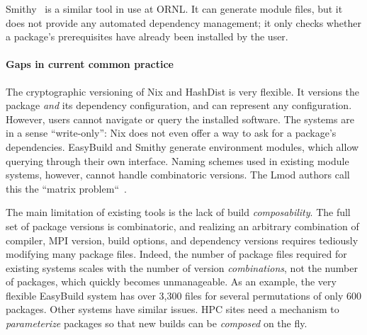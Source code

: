Smithy~\cite{digirolamo:smithy} is a similar tool in use at ORNL. It
can generate module files, but it does not provide any
automated dependency management; it only checks whether a package's
prerequisites have already been installed by the user.

\paragraph{Gaps in current common practice}
The cryptographic versioning of Nix and HashDist is very flexible. It versions
the package {\it and} its dependency configuration, and can represent any
configuration. However, users cannot navigate or query the installed software.
The systems are in a sense ``write-only'':
Nix does not even offer a way to ask for a package's dependencies.
%
EasyBuild and Smithy generate environment modules, which allow querying
through their own interface. Naming schemes used in existing module systems, however, cannot
handle combinatoric versions. The Lmod authors call this the
``matrix problem``~\cite{mclay:lmod-tutorial}.



The main limitation of existing tools is the lack of build {\it composability}.
The full set of package versions is combinatoric, and realizing an arbitrary
combination of compiler, MPI version, build options, and dependency versions
requires tediously modifying many package files.
%
Indeed, the number of package files required for existing systems scales with
the number of version {\it combinations}, not the number of packages, which
quickly becomes unmanageable.  As an example, the very flexible EasyBuild
system has over 3,300 files for several permutations of only 600 packages.
Other systems have similar issues. HPC sites need a mechanism to
{\it parameterize} packages so that new builds can be {\it composed} on the fly.

